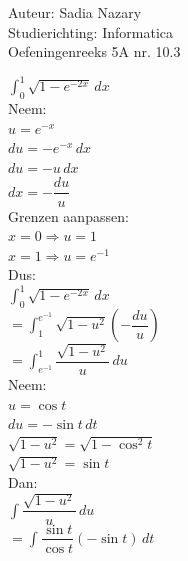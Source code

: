 \documentclass[a4paper]{article}
\begin{document}
\noindent \large Auteur: Sadia Nazary \\
\noindent \large Studierichting: Informatica\\
\noindent \large Oefeningenreeks 5A nr. 10.3\\

\medskip

\normalsize

$\displaystyle \int_0^1\sqrt{1-e^{-2x}}\,dx$\\

Neem:\\

$u=e^{-x}$\\

$du=-e^{-x}\,dx$\\

$du=-u\,dx$\\

$dx=-\dfrac{du}{u}$\\

Grenzen aanpassen:\\

$x=0\Rightarrow u=1$\\

$x=1\Rightarrow u=e^{-1}$\\

Dus:\\

$\displaystyle \int_0^1\sqrt{1-e^{-2x}}\,dx$\\

$=
\displaystyle \int_1^{e^{-1}}
\sqrt{1-u^2}\left(-\dfrac{du}{u}\right)$\\

$=
\displaystyle \int_{e^{-1}}^1
\dfrac{\sqrt{1-u^2}}{u}\,du$\\

Neem:\\

$u=\cos t$\\

$du=-\sin t\,dt$\\

$\sqrt{1-u^2}=\sqrt{1-\cos^2t}$\\

$\sqrt{1-u^2}=\sin t$\\

Dan:\\

$\displaystyle \int\dfrac{\sqrt{1-u^2}}{u}\,du$\\

$=
\displaystyle \int
\dfrac{\sin t}{\cos t}(-\sin t)\,dt$\\
\end{document}

